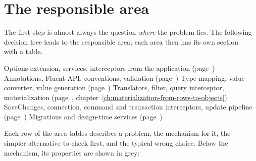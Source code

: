 \section{The responsible area}

The first step is almost always the question \emph{where} the problem lies. The following
decision tree leads to the responsible area; each area then has its own section with a
table.

\begin{decisiontree}
    {Options extension, services, interceptors from the application
    (page~\pageref{sec:decide-configuration})}
    {Annotations, Fluent API, conventions, validation (page~\pageref{sec:decide-model})}
    {Type mapping, value converter, value generation (page~\pageref{sec:decide-model})}
    {Translators, filter, query interceptor, materialization
    (page~\pageref{sec:decide-queries}, chapter~\ref{ch:materialization-from-rows-to-objects})}
    {SaveChanges, connection, command and transaction interceptors, update pipeline
    (page~\pageref{sec:decide-runtime})}
    {Migrations and design-time services (page~\pageref{sec:decide-tooling})}
\end{decisiontree}

Each row of the area tables describes a problem, the mechanism for it, the simpler
alternative to check first, and the typical wrong choice. Below the mechanism, its
properties are shown in grey:

